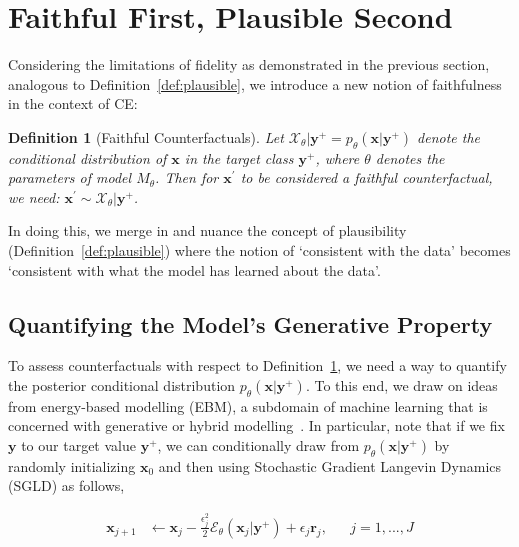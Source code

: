 \documentclass[letterpaper]{article} %
\newtheorem{definition}{Definition}[section]
\begin{document}
\section{Faithful First, Plausible Second}\label{faithfulness}

Considering the limitations of fidelity as demonstrated in the previous section, analogous to Definition~\ref{def:plausible}, we introduce a new notion of faithfulness in the context of CE:

\begin{definition}[Faithful Counterfactuals]
  \label{def:faithful}
  Let $\mathcal{X}_{\theta}|\mathbf{y}^+ = p_{\theta}(\mathbf{x}|\mathbf{y}^+)$ denote the conditional distribution of $\mathbf{x}$ in the target class $\mathbf{y}^+$, where $\theta$ denotes the parameters of model $M_{\theta}$. Then for $\mathbf{x}^{\prime}$ to be considered a faithful counterfactual, we need: $\mathbf{x}^{\prime} \sim \mathcal{X}_{\theta}|\mathbf{y}^+$.
\end{definition}

In doing this, we merge in and nuance the concept of plausibility (Definition~\ref{def:plausible}) where the notion of `consistent with the data' becomes `consistent with what the model has learned about the data'.

\subsection{Quantifying the Model’s Generative Property}

To assess counterfactuals with respect to Definition~\ref{def:faithful}, we need a way to quantify the posterior conditional distribution $p_{\theta}(\mathbf{x}|\mathbf{y}^+)$. To this end, we draw on ideas from energy-based modelling (EBM), a subdomain of machine learning that is concerned with generative or hybrid modelling~\citep{grathwohl2020your,du2019implicit}. In particular, note that if we fix $\mathbf{y}$ to our target value $\mathbf{y}^+$, we can conditionally draw from $p_{\theta}(\mathbf{x}|\mathbf{y}^+)$ by randomly initializing $\mathbf{x}_0$ and then using Stochastic Gradient Langevin Dynamics (SGLD) as follows, 

\begin{equation}\label{eq:sgld}
  \begin{aligned}
    \mathbf{x}_{j+1} &\leftarrow \mathbf{x}_j - \frac{\epsilon_j^2}{2} \mathcal{E}_{\theta}(\mathbf{x}_j|\mathbf{y}^+) + \epsilon_j \mathbf{r}_j, && j=1,...,J
  \end{aligned}
\end{equation}
\end{document}
